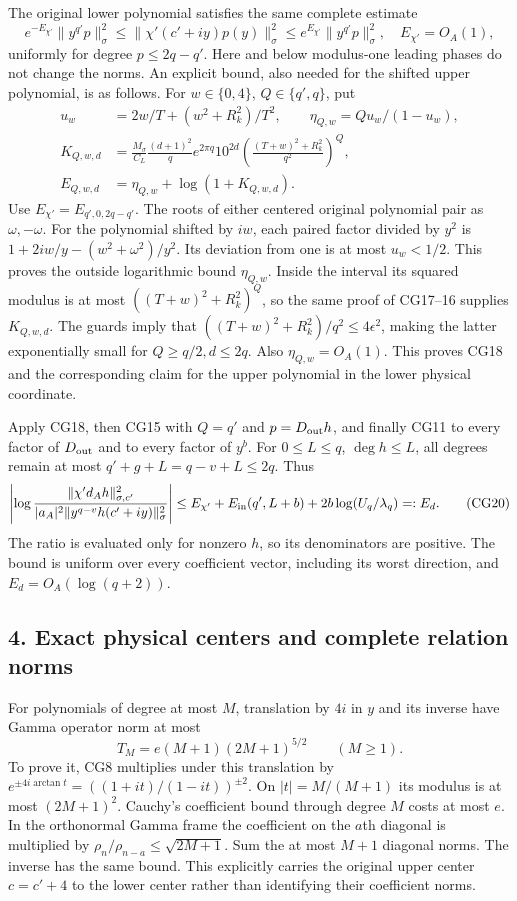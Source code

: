 The original lower polynomial satisfies the same complete estimate \[
e^{-E_{\chi'}}\|y^{q'}p\|_\sigma^2
\le\|\chi'(c'+iy)p(y)\|_\sigma^2
\le e^{E_{\chi'}}\|y^{q'}p\|_\sigma^2,
\quad E_{\chi'}=O_A(1),
\tag{CG18}
\] uniformly for degree \(p\le2q-q'\). Here and below modulus-one leading phases do not change the norms. An explicit bound, also needed for the shifted upper polynomial, is as follows. For \(w\in\{0,4\}\), \(Q\in\{q',q\}\), put \[
\begin{split}
u_w&=2w/T+(w^2+R_k^2)/T^2,\qquad
\eta_{Q,w}=Qu_w/(1-u_w),\\
K_{Q,w,d}&=\frac{M_\sigma}{C_L}\frac{(d+1)^2}{q}
e^{2\pi q}10^{2d}
\left(\frac{(T+w)^2+R_k^2}{q^2}\right)^Q,\\
E_{Q,w,d}&=\eta_{Q,w}+\log(1+K_{Q,w,d}).
\end{split}\tag{CG19}
\] Use \(E_{\chi'}=E_{q',0,2q-q'}\). The roots of either centered original polynomial pair as \(\omega,-\omega\). For the polynomial shifted by \(iw\), each paired factor divided by \(y^2\) is \(1+2iw/y-(w^2+\omega^2)/y^2\). Its deviation from one is at most \(u_w<1/2\). This proves the outside logarithmic bound \(\eta_{Q,w}\). Inside the interval its squared modulus is at most \(((T+w)^2+R_k^2)^Q\), so the same proof of CG17--16 supplies \(K_{Q,w,d}\). The guards imply that \(((T+w)^2+R_k^2)/q^2\le4\epsilon^2\), making the latter exponentially small for \(Q\ge q/2,d\le2q\). Also \(\eta_{Q,w}=O_A(1)\). This proves CG18 and the corresponding claim for the upper polynomial in the lower physical coordinate.

Apply CG18, then CG15 with \(Q=q'\) and \(p=D_{\rm out}h\), and finally CG11 to every factor of \(D_{\rm out}\) and to every factor of \(y^b\). For \(0\le L\le q\), \(\deg h\le L\), all degrees remain at most \(q'+g+L=q-v+L\le2q\). Thus \[
\left|\log\frac{\|\chi' d_Ah\|_{\sigma,c'}^2}
 {|a_A|^2\|y^{q-v}h(c'+iy)\|_\sigma^2}\right|
\le E_{\chi'}+E_{\rm in}(q',L+b)
+2b\log(U_q/\lambda_q)=:E_d.
\tag{CG20}
\] The ratio is evaluated only for nonzero \(h\), so its denominators are positive. The bound is uniform over every coefficient vector, including its worst direction, and \(E_d=O_A(\log(q+2))\).

\subsection{4. Exact physical centers and complete relation norms}\label{exact-physical-centers-and-complete-relation-norms}

For polynomials of degree at most \(M\), translation by \(4i\) in \(y\) and its inverse have Gamma operator norm at most \[
T_M=e(M+1)(2M+1)^{5/2}\qquad(M\ge1).
\tag{CG21}
\] To prove it, CG8 multiplies under this translation by \(e^{\pm4i\arctan t}=((1+it)/(1-it))^{\pm2}\). On \(|t|=M/(M+1)\) its modulus is at most \((2M+1)^2\). Cauchy's coefficient bound through degree \(M\) costs at most \(e\). In the orthonormal Gamma frame the coefficient on the \(a\)th diagonal is multiplied by \(\rho_n/\rho_{n-a}\le\sqrt{2M+1}\). Sum the at most \(M+1\) diagonal norms. The inverse has the same bound. This explicitly carries the original upper center \(c=c'+4\) to the lower center rather than identifying their coefficient norms.

